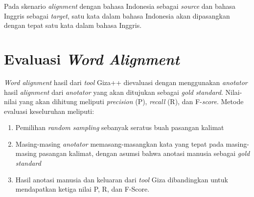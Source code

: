 Pada skenario \textit{alignment} dengan bahasa Indonesia sebagai \textit{source} dan bahasa Inggris sebagai \textit{target}, satu kata dalam bahasa Indonesia akan dipasangkan dengan tepat satu kata dalam bahasa Inggris.

\section{Evaluasi \textit{Word Alignment}} \label{sec:pembentukanTdanH}
\textit{Word alignment} hasil dari \textit{tool} Giza++ dievaluasi dengan menggunakan \textit{anotator} hasil \textit{alignment} dari \textit{anotator} yang akan ditujukan sebagai \textit{gold standard}. Nilai-nilai yang akan dihitung meliputi \textit{precision} (P), \textit{recall} (R), dan F-\textit{score}. Metode evaluasi keseluruhan meliputi:

\begin{enumerate}
	\item Pemilihan \textit{random sampling} sebanyak seratus buah pasangan kalimat
	\item Masing-masing \textit{anotator} memasang-masangkan kata yang tepat pada masing-masing pasangan kalimat, dengan asumsi bahwa anotasi manusia sebagai \textit{gold standard}
	\item Hasil anotasi manusia dan keluaran dari \textit{tool} Giza dibandingkan untuk mendapatkan ketiga nilai P, R, dan F-Score.
\end{enumerate}


